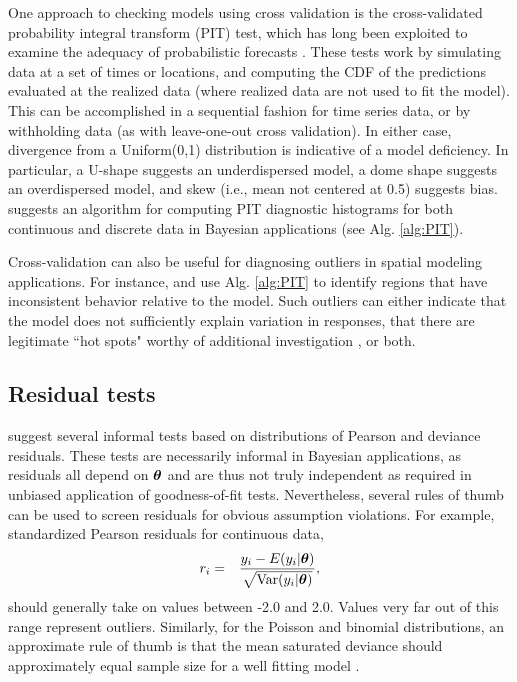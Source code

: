 \documentclass[12pt,english]{article}
\begin{document}
\begin{spacing}{1.9}
One approach to checking models using cross validation is the cross-validated probability integral transform (PIT) test, which has long been exploited to examine the adequacy of probabilistic forecasts \citep[e.g.,][]{Dawid1984,Fruiiwirth1996,GneitingEtAl2007,CzadoEtAl2009}. These tests work by simulating data at a set of times or locations, and computing the CDF of the predictions evaluated at the realized data (where realized data are not used to fit the model).  This can be accomplished in a sequential fashion for time series data, or by withholding data (as with leave-one-out cross validation).  In either case, divergence from a Uniform(0,1) distribution is indicative of a model deficiency.  In particular, a U-shape suggests an underdispersed model, a dome shape suggests an overdispersed model, and skew (i.e., mean not centered at 0.5) suggests bias.  \citet{Congdon2014} suggests an algorithm for computing PIT diagnostic histograms for both continuous and discrete data in Bayesian applications (see Alg. \ref{alg:PIT}).

Cross-validation can also be useful for diagnosing outliers in spatial modeling applications.  For instance, \citet{SternCressie2000} and \citet{MarshallSpiegelhalter2003} use Alg. \ref{alg:PIT} to identify regions that have inconsistent behavior relative to the model.  Such outliers can either indicate that the model does not sufficiently explain variation in responses, that there are legitimate ``hot spots" worthy of additional investigation \cite{MarshallSpiegelhalter2003}, or both.

\subsection{Residual tests}

\citet{LunnEtAl2013} suggest several informal tests based on distributions of Pearson and deviance residuals.  These tests are necessarily informal in Bayesian applications, as residuals all depend on $\boldsymbol{\theta}$ and are thus not truly independent as required in unbiased application of goodness-of-fit tests.  Nevertheless, several rules of thumb can be used to screen residuals for obvious assumption violations.  For example, standardized Pearson residuals for continuous data,
\begin{eqnarray*}
  r_i & = & \frac{y_i - E(y_i|\boldsymbol{\theta})}{\sqrt{\textrm{Var}(y_i | \boldsymbol{\theta})}},
\end{eqnarray*}
should generally take on values between -2.0 and 2.0.  Values very far out of this range represent outliers.
Similarly, for the Poisson and binomial distributions, an approximate rule of thumb is that the mean saturated deviance should approximately equal sample size for a well fitting model \citep{LunnEtAl2013}.


\end{spacing}
\end{document}
